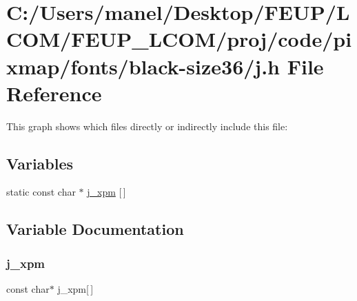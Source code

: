 \hypertarget{black-size36_2j_8h}{}\section{C\+:/\+Users/manel/\+Desktop/\+F\+E\+U\+P/\+L\+C\+O\+M/\+F\+E\+U\+P\+\_\+\+L\+C\+O\+M/proj/code/pixmap/fonts/black-\/size36/j.h File Reference}
\label{black-size36_2j_8h}
This graph shows which files directly or indirectly include this file\+:
\subsection*{Variables}
\begin{DoxyCompactItemize}
\item 
static const char $\ast$ \mbox{\hyperlink{black-size36_2j_8h_a702e3b72fee5c7a48cabf737e04071a0}{j\+\_\+xpm}} \mbox{[}$\,$\mbox{]}
\end{DoxyCompactItemize}


\subsection{Variable Documentation}
\mbox{\label{black-size36_2j_8h_a702e3b72fee5c7a48cabf737e04071a0}} 
\subsubsection{\texorpdfstring{j\_xpm}{j\_xpm}}
{\footnotesize\ttfamily const char$\ast$ j\+\_\+xpm\mbox{[}$\,$\mbox{]}\hspace{0.3cm}{\ttfamily [static]}}

